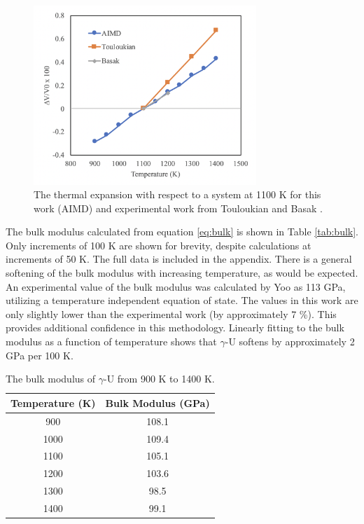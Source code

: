 \documentclass[review]{elsarticle}
\begin{document}
\begin{figure}[h]
 \centering
 \includegraphics[width=0.75\textwidth]{3_thermal_exp.png} 
 \caption{The thermal expansion with respect to a system at 1100 K for this work (AIMD) and experimental work from Touloukian \cite{touloukian} and Basak \cite{basak} .   }
 \label{fig:exp}
\end{figure}

\FloatBarrier

The bulk modulus calculated from equation \ref{eq:bulk} is shown in Table \ref{tab:bulk}. Only increments of 100 K are shown for brevity, despite calculations at increments of 50 K. The full data is included in the appendix. There is a general softening of the bulk modulus with increasing temperature, as would be expected. An experimental value of the bulk modulus was calculated by Yoo \cite{yoo1998} as 113 GPa, utilizing a temperature independent equation of state. The values in this work are only slightly lower than the experimental work (by approximately 7 {\%}). This provides additional confidence in this methodology. Linearly fitting to the bulk modulus as a function of temperature shows that $\gamma$-U softens by approximately 2 GPa per 100 K. 

\begin{table}[h]
\caption{The bulk modulus of $\gamma$-U from 900 K to 1400 K.} \label{tab:bulk}
\begin{center}
\begin{tabular}{|c|c|}
	\hline
	Temperature (K) & Bulk Modulus (GPa) \\
	 \hline
	 900 & 108.1 \\
	 1000 & 109.4 \\
	 1100 & 105.1 \\
	 1200 & 103.6 \\	 
	 1300 & 98.5\\
	 1400 & 99.1 \\
	 \hline
\end{tabular}
\end{center}
\label{default}
\end{table}
\end{document}
